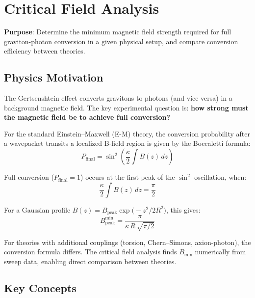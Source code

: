 
\section{Critical Field Analysis}
\label{sec:critical-field}

\textbf{Purpose}: Determine the minimum magnetic field strength required for full
graviton-photon conversion in a given physical setup, and compare conversion
efficiency between theories.

\subsection{Physics Motivation}
\label{sec:cf-motivation}

The Gertsenshtein effect converts gravitons to photons (and vice versa) in a
background magnetic field. The key experimental question is: \textbf{how strong
must the magnetic field be to achieve full conversion?}

For the standard Einstein--Maxwell (E-M) theory, the conversion probability
after a wavepacket transits a localized B-field region is given by the
Boccaletti formula:
\begin{equation}
  P_\text{final} = \sin^2\!\left(\frac{\kappa}{2} \int B(z)\, dz\right)
  \label{eq:cf-boccaletti}
\end{equation}

Full conversion ($P_\text{final} = 1$) occurs at the first peak of the $\sin^2$
oscillation, when:
\begin{equation}
  \frac{\kappa}{2} \int B(z)\, dz = \frac{\pi}{2}
  \label{eq:cf-full-conversion}
\end{equation}

For a Gaussian profile $B(z) = B_\text{peak} \exp\!\bigl(-z^2 / 2R^2\bigr)$, this gives:
\begin{equation}
  B_\text{peak}^\text{min} = \frac{\pi}{\kappa\, R\, \sqrt{\pi/2}}
  \label{eq:Bpeak-min}
\end{equation}

For theories with additional couplings (torsion, Chern--Simons, axion-photon),
the conversion formula differs. The critical field analysis finds $B_\text{min}$
numerically from sweep data, enabling direct comparison between theories.

\subsection{Key Concepts}
\label{sec:cf-concepts}

